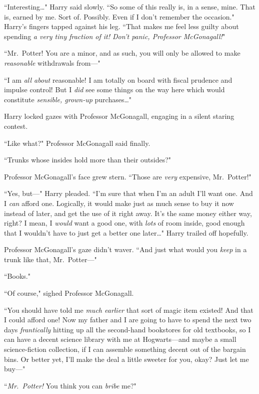 ``Interesting{\ldots}" Harry said slowly. ``So some of this really is, in a sense, mine. That is, earned by me. Sort of. Possibly. Even if I don't remember the occasion." Harry's fingers tapped against his leg. ``That makes me feel less guilty about spending \emph{a very tiny fraction of it! Don't panic, Professor McGonagall!}"

``Mr.~Potter! You are a minor, and as such, you will only be allowed to make \emph{reasonable} withdrawals from—"

``I am \emph{all about} reasonable! I am totally on board with fiscal prudence and impulse control! But I \emph{did} see some things on the way here which would constitute \emph{sensible, grown-up} purchases{\ldots}"

Harry locked gazes with Professor McGonagall, engaging in a silent staring contest.

``Like what?" Professor McGonagall said finally.

``Trunks whose insides hold more than their outsides?"

Professor McGonagall's face grew stern. ``Those are \emph{very} expensive, Mr.~Potter!"

``Yes, but—" Harry pleaded. ``I'm sure that when I'm an adult I'll want one. And I \emph{can} afford one. Logically, it would make just as much sense to buy it now instead of later, and get the use of it right away. It's the same money either way, right? I mean, I \emph{would} want a good one, with \emph{lots} of room inside, good enough that I wouldn't have to just get a better one later{\ldots}" Harry trailed off hopefully.

Professor McGonagall's gaze didn't waver. ``And just what would you \emph{keep} in a trunk like that, Mr.~Potter—"

``Books."

``Of course," sighed Professor McGonagall.

``You should have told me \emph{much earlier} that sort of magic item existed! And that I could afford one! Now my father and I are going to have to spend the next two days \emph{frantically} hitting up all the second-hand bookstores for old textbooks, so I can have a decent science library with me at Hogwarts—and maybe a small science-fiction collection, if I can assemble something decent out of the bargain bins. Or better yet, I'll make the deal a little sweeter for you, okay? Just let me buy—"

``\emph{Mr.~Potter!} You think you can \emph{bribe} me?"

